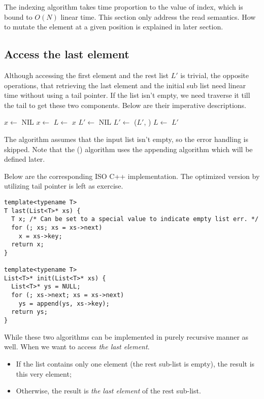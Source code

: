 \documentclass{article}
\begin{document}
The indexing algorithm takes time proportion to the value of index, which is bound to $O(N)$
linear time. 
This section only address the read semantics. How to mutate the element at a given position is
explained in later section.

\subsection{Access the last element}
Although accessing the first element and the rest list $L'$ is trivial, the opposite operations, that
retrieving the last element and the initial sub list need linear time without using a tail pointer. 
If the list isn't empty, we need traverse it till the tail to get these two components. Below are 
their imperative descriptions.

\begin{algorithmic}
  \State $x \gets $ NIL
    \State $x \gets $ 
    \State $L \gets $ 
  \EndWhile
  \State \Return $x$
\EndFunction
\Statex
{}
  \State $L' \gets $ NIL
    \State $L' \gets$ ($L'$, )
    \State $L \gets $ 
  \EndWhile
  \State \Return $L'$
\EndFunction
\end{algorithmic}

The algorithm assumes that the input list isn't empty, so the error handling is skipped. Note that
the () algorithm uses the appending algorithm which will be defined later.

Below are the corresponding ISO C++ implementation. The optimized version by utilizing tail pointer
is left as exercise.

\lstset{language=C++}
\begin{lstlisting}
template<typename T>
T last(List<T>* xs) {
  T x; /* Can be set to a special value to indicate empty list err. */
  for (; xs; xs = xs->next)
    x = xs->key;
  return x;
}

template<typename T>
List<T>* init(List<T>* xs) {
  List<T>* ys = NULL;
  for (; xs->next; xs = xs->next)
    ys = append(ys, xs->key);
  return ys;
}
\end{lstlisting}

While these two algorithms can be implemented in purely recursive manner as well. When we want to access
{\em the last element}. 

\begin{itemize}
\item If the list contains only one element (the rest sub-list is empty), the result is this very element;
\item Otherwise, the result is {\em the last element} of the rest sub-list.
\end{itemize}
\end{document}
